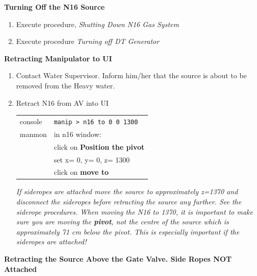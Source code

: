 {\bf Turning Off the N16 Source}

\begin{enumerate}
\item \CheckBox[name=n16sd1]{} Execute procedure, {\it Shutting Down N16 Gas System}
\item \CheckBox[name=n16sd2]{} Execute procedure {\it Turning off DT Generator}
\end{enumerate}

{\bf Retracting Manipulator to UI}

\begin{enumerate}
\item \CheckBox[name=n16rmui1]{} Contact Water Supervisor. Inform him/her that the source is about to be removed from the Heavy water.
\item \CheckBox[name=n16rmui2]{} Retract N16 from AV into UI
	\begin{center}
	\begin{tabular}{|l|l|}
	\hline
	console & \verb+manip > n16 to 0 0 1300+ \\
	manmon & in n16 window: \\
	& click on {\bf Position the pivot}\\
	& set x= 0, y= 0, z= 1300 \\
	& click on {\bf move to} \\
	\hline
	\end{tabular}
	\end{center}
{\it If sideropes are attached move the source to approximately z=1370 and disconnect the sideropes before retracting the source any further. See the siderope procedures. When moving the N16 to 1370, it is important to make sure you are moving the {\bf pivot}, not the centre of the source which is approximately 71 cm below the pivot. This is especially important if the sideropes are attached!}
\end{enumerate}

{\bf Retracting the Source Above the Gate Valve. Side Ropes NOT Attached}

